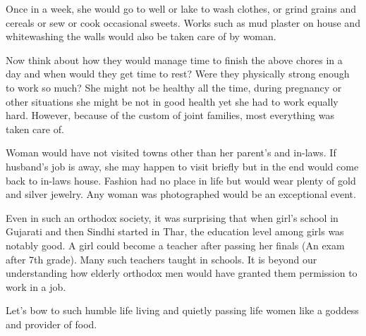 Once in a week, she would go to well or lake to wash clothes, or grind grains
and cereals or sew or cook occasional sweets. Works such as mud plaster on
house and whitewashing the walls would also be taken care of by woman.

Now think about how they would manage time to finish the above chores in a day
and when would they get time to rest? Were they physically strong enough to
work so much? She might not be healthy all the time, during pregnancy or other
situations she might be not in good health yet she had to work equally hard.
However, because of the custom of joint families, most everything was taken
care of.

Woman would have not visited towns other than her parent's and in-laws. If
husband's job is away, she may happen to visit briefly but in the end would
come back to in-laws house. Fashion had no place in life but would wear plenty
of gold and silver jewelry. Any woman was photographed would be an exceptional
event.

Even in such an orthodox society, it was surprising that when girl's school in
Gujarati and then Sindhi started in Thar, the education level among girls was
notably good. A girl could become a teacher after passing her finals (An exam
after 7th grade). Many such teachers taught in schools. It is beyond our
understanding how elderly orthodox men would have granted them permission to
work in a job.

Let's bow to such humble life living and quietly passing life women like a
goddess and provider of food.
